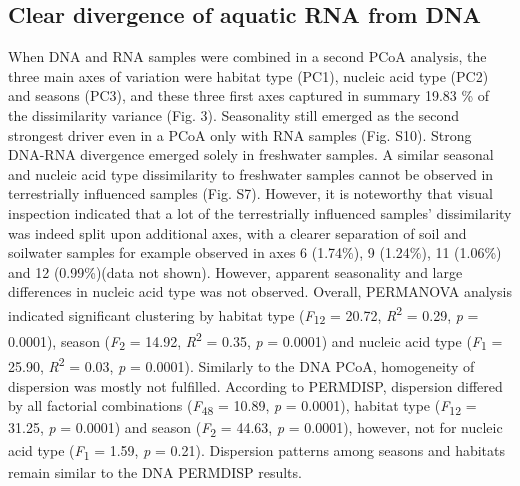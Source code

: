\documentclass[12pt,a4paper]{article} %
\begin{document}
\subsection*{Clear divergence of aquatic RNA from DNA}
When DNA and RNA samples were combined in a second PCoA analysis, the three main axes of variation were habitat type (PC1), nucleic acid type (PC2) and seasons (PC3), and these three first axes captured in summary 19.83 \% of the dissimilarity variance (Fig. 3). Seasonality still emerged as the second strongest driver even in a PCoA only with RNA samples (Fig. S10). Strong DNA-RNA divergence emerged solely in freshwater samples. A similar seasonal and nucleic acid type dissimilarity to freshwater samples cannot be observed in terrestrially influenced samples (Fig. S7). However, it is noteworthy that visual inspection indicated that a lot of the terrestrially influenced samples’ dissimilarity was indeed split upon additional axes, with a clearer separation of soil and soilwater samples for example observed in axes 6 (1.74\%), 9 (1.24\%), 11 (1.06\%) and 12 (0.99\%)(data not shown). However, apparent seasonality and large differences in nucleic acid type was not observed. Overall, PERMANOVA analysis indicated significant clustering by habitat type (\textit{F}\textsubscript{12} = 20.72, \textit{R}\textsuperscript{2} = 0.29, \textit{p} = 0.0001), season (\textit{F}\textsubscript{2} = 14.92, \textit{R}\textsuperscript{2} = 0.35, \textit{p} = 0.0001) and nucleic acid type (\textit{F}\textsubscript{1} = 25.90, \textit{R}\textsuperscript{2} = 0.03, \textit{p} = 0.0001). Similarly to the DNA PCoA, homogeneity of dispersion was mostly not fulfilled. According to PERMDISP, dispersion differed by all factorial combinations (\textit{F}\textsubscript{48} = 10.89, \textit{p} = 0.0001), habitat type (\textit{F}\textsubscript{12} = 31.25, \textit{p} = 0.0001) and season (\textit{F}\textsubscript{2} = 44.63, \textit{p} = 0.0001), however, not for nucleic acid type (\textit{F}\textsubscript{1} = 1.59, \textit{p} = 0.21). Dispersion patterns among seasons and habitats remain similar to the DNA PERMDISP results.
\end{document}
